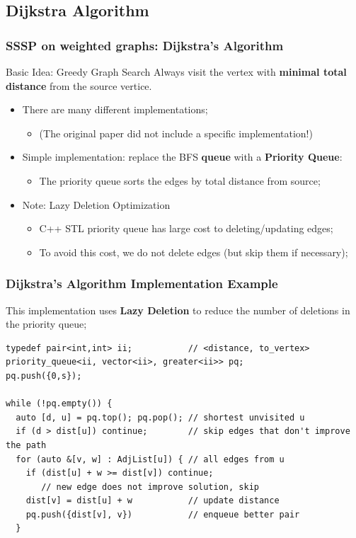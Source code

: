 \subsection{Dijkstra Algorithm}
\begin{frame}
  \frametitle{SSSP on weighted graphs: Dijkstra's Algorithm}
  \begin{block}{Basic Idea: Greedy Graph Search}
    Always visit the vertex with {\bf minimal total distance} from the source vertice.
  \end{block}\bigskip

  \begin{itemize}
  \item There are many different implementations;
  \begin{itemize}
    \item (The original paper did not include a specific implementation!)
  \end{itemize}\bigskip

  \item Simple implementation: replace the BFS {\bf queue} with a {\bf Priority Queue}:
  \begin{itemize}
    \item The priority queue sorts the edges by total distance from source;
  \end{itemize}\bigskip

  \item Note: Lazy Deletion Optimization
  \begin{itemize}
    \item C++ STL priority queue has large cost to deleting/updating edges;
    \item To avoid this cost, we do not delete edges (but skip them if necessary);
  \end{itemize}
  \end{itemize}

\end{frame}

\begin{frame}[fragile]
  \frametitle{Dijkstra's Algorithm Implementation Example}

  This implementation uses {\bf Lazy Deletion} to reduce the number of deletions in the priority queue;

  {\smaller
    \begin{exampleblock}{}
\begin{verbatim}
typedef pair<int,int> ii;           // <distance, to_vertex>
priority_queue<ii, vector<ii>, greater<ii>> pq;
pq.push({0,s});

while (!pq.empty()) {
  auto [d, u] = pq.top(); pq.pop(); // shortest unvisited u
  if (d > dist[u]) continue;        // skip edges that don't improve the path
  for (auto &[v, w] : AdjList[u]) { // all edges from u
    if (dist[u] + w >= dist[v]) continue;
       // new edge does not improve solution, skip
    dist[v] = dist[u] + w           // update distance
    pq.push({dist[v], v})           // enqueue better pair
  }
\end{verbatim}
    \end{exampleblock}}
\end{frame}

